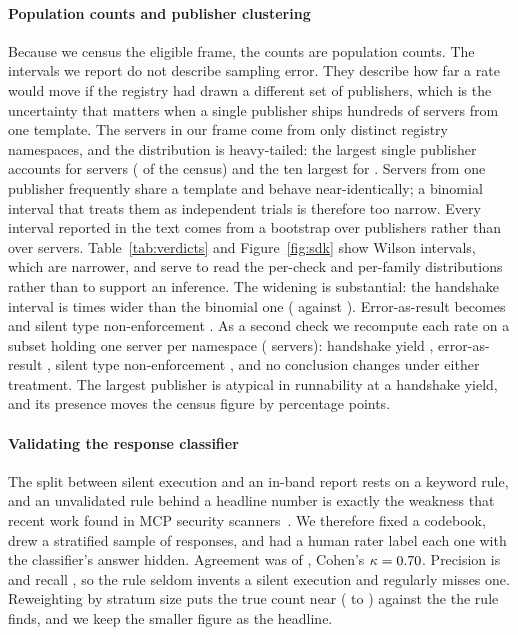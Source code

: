 \paragraph{Population counts and publisher clustering}
Because we census the eligible frame, the counts are population counts. The intervals
we report do not describe sampling error. They describe how far a rate would move if
the registry had drawn a different set of publishers, which is the uncertainty that
matters when a single publisher ships hundreds of servers from one template. The
\Nprobed{} servers in our frame come from only \Npublishers{} distinct registry
namespaces, and the distribution is heavy-tailed: the largest single publisher
accounts for \TopPublisherN{} servers (\TopPublisherPct{} of the census) and the ten
largest for \TopTenPct{}. Servers from one publisher frequently share a template and
behave near-identically; a binomial interval that treats them as independent trials
is therefore too narrow. Every interval
reported in the text comes from a bootstrap over publishers rather than over servers.
Table~\ref{tab:verdicts} and Figure~\ref{fig:sdk} show Wilson intervals, which are
narrower, and serve to read the per-check and per-family distributions rather than to
support an inference. The widening is substantial: the handshake
interval is \HandshakeDesignEffect{} times wider than the binomial one
(\HandshakeRateCl{} against \HandshakeRate{}). Error-as-result becomes
\ErrAsResultRateCl{} and silent type non-enforcement \NoTypecheckRateCl{}. As a second
check we recompute each rate on a subset holding one server per namespace
(\NuniqPub{} servers): handshake yield \HandshakeRatePub{}, error-as-result
\ErrAsResultRatePub{}, silent type non-enforcement \NoTypecheckRatePub{}, and no
conclusion changes under either treatment. The largest publisher is atypical in
runnability at a \TopPublisherHandshake{} handshake yield, and its presence moves the
census figure by \TopPublisherDepressionPP{} percentage points.

\paragraph{Validating the response classifier}
The split between silent execution and an in-band report rests on a keyword rule, and
an unvalidated rule behind a headline number is exactly the weakness that recent work
found in MCP security scanners~\cite{mcpzoo}. We therefore fixed a codebook, drew a
stratified sample of \ValN{} responses, and had a human rater label each one with the
classifier's answer hidden. Agreement was \ValAgree{} of \ValN{}, Cohen's
\(\kappa = 0.70{}\). Precision is \ValPrecision{} and recall \ValRecall{}, so the
rule seldom invents a silent execution and regularly misses one. Reweighting by
stratum size puts the true count near \NSilentExecCorrected{}
(\NSilentExecCorrectedLo{} to \NSilentExecCorrectedHi{}) against the
\NSilentExec{} the rule finds, and we keep the smaller figure as the headline.

